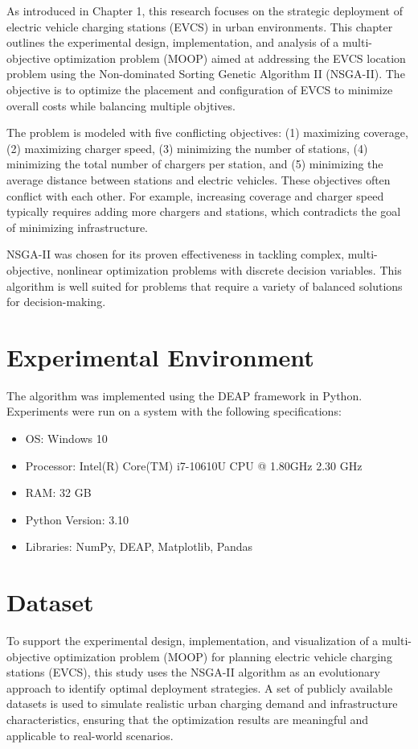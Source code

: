 As introduced in Chapter 1, this research focuses on the strategic deployment of electric vehicle charging stations (EVCS) in urban environments. This chapter outlines the experimental design, implementation, and analysis of a multi-objective optimization problem (MOOP) aimed at addressing the EVCS location problem using the Non-dominated Sorting Genetic Algorithm II (NSGA-II). The objective is to optimize the placement and configuration of EVCS to minimize overall costs while balancing multiple objtives.

The problem is modeled with five conflicting objectives: (1) maximizing coverage, (2) maximizing charger speed, (3) minimizing the number of stations, (4) minimizing the total number of chargers per station, and (5) minimizing the average distance between stations and electric vehicles. These objectives often conflict with each other. For example, increasing coverage and charger speed typically requires adding more chargers and stations, which contradicts the goal of minimizing infrastructure.

NSGA-II was chosen for its proven effectiveness in tackling complex, multi-objective, nonlinear optimization problems with discrete decision variables. This algorithm is well suited for problems that require a variety of balanced solutions for decision-making.

\section{Experimental Environment}

The algorithm was implemented using the DEAP framework in Python. Experiments were run on a system with the following specifications:

\begin{itemize}
    \item OS: Windows 10
    \item Processor: Intel(R) Core(TM) i7-10610U CPU @ 1.80GHz   2.30 GHz
    \item RAM: 32 GB
    \item Python Version: 3.10
    \item Libraries: NumPy, DEAP, Matplotlib, Pandas
\end{itemize}

\section{Dataset}

To support the experimental design, implementation, and visualization of a multi-objective optimization problem (MOOP) for planning electric vehicle charging stations (EVCS), this study uses the NSGA-II algorithm as an evolutionary approach to identify optimal deployment strategies. A set of publicly available datasets is used to simulate realistic urban charging demand and infrastructure characteristics, ensuring that the optimization results are meaningful and applicable to real-world scenarios.

